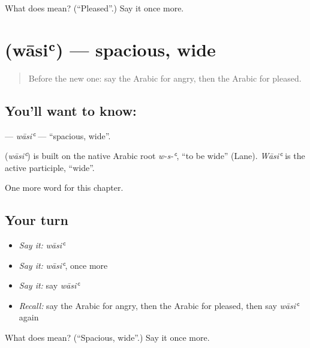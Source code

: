 \begin{tcolorbox}[breakable,colback=teal!4,colframe=teal!35!black,title={Before you move on}]
What does  mean? (\textquotedblleft{}Pleased\textquotedblright{}.) Say it once more.
\end{tcolorbox}
\section[\texorpdfstring{\ar{واسع} (wāsiʿ)}{واسع (wāsiʿ)}]{ (wāsiʿ) — spacious, wide}

\label{lesson:AR-C148-wasi}



\begin{quote}
Before the new one: say the Arabic for angry, then the Arabic for pleased.
\end{quote}

\subsection*{You'll want to know: }
\textbf{} — \emph{wāsiʿ} — \textquotedblleft{}spacious, wide\textquotedblright{}.

\begin{cousinweb}
\textbf{} (\emph{wāsiʿ}) is built on the native Arabic root \emph{w-s-ʿ}, \textquotedblleft{}to be wide\textquotedblright{} (Lane). \emph{Wāsiʿ} is the active participle, \textquotedblleft{}wide\textquotedblright{}.
\end{cousinweb}

\begin{grammarlens}[title={What you've built}]
One more word for this chapter.
\end{grammarlens}

\subsection*{Your turn}
\begin{itemize}
\raggedright
  \item \emph{Say it:} \emph{wāsiʿ}
  \item \emph{Say it:} \emph{wāsiʿ}, once more
  \item \emph{Say it:} say \emph{wāsiʿ}
  \item \emph{Recall:} say the Arabic for angry, then the Arabic for pleased, then say \emph{wāsiʿ} again
\end{itemize}

\begin{tcolorbox}[breakable,colback=teal!4,colframe=teal!35!black,title={Before you move on}]
What does  mean? (\textquotedblleft{}Spacious, wide\textquotedblright{}.) Say it once more.
\end{tcolorbox}
